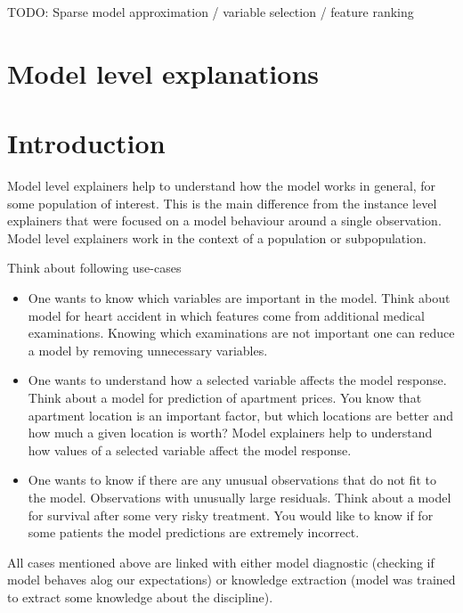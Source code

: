 \documentclass[]{krantz}
\providecommand{\tightlist}{%
  \setlength{\itemsep}{0pt}\setlength{\parskip}{0pt}}
\theoremstyle{definition}
\theoremstyle{definition}
\theoremstyle{definition}
\theoremstyle{remark}
\begin{document}
TODO: Sparse model approximation / variable selection / feature ranking

\hypertarget{model-level-explanations}{%
\section*{Model level explanations}\label{model-level-explanations}}

\hypertarget{introduction-3}{%
\section{Introduction}\label{introduction-3}}

Model level explainers help to understand how the model works in
general, for some population of interest. This is the main difference
from the instance level explainers that were focused on a model
behaviour around a single observation. Model level explainers work in
the context of a population or subpopulation.

Think about following use-cases

\begin{itemize}
\tightlist
\item
  One wants to know which variables are important in the model. Think
  about model for heart accident in which features come from additional
  medical examinations. Knowing which examinations are not important one
  can reduce a model by removing unnecessary variables.
\item
  One wants to understand how a selected variable affects the model
  response. Think about a model for prediction of apartment prices. You
  know that apartment location is an important factor, but which
  locations are better and how much a given location is worth? Model
  explainers help to understand how values of a selected variable affect
  the model response.
\item
  One wants to know if there are any unusual observations that do not
  fit to the model. Observations with unusually large residuals. Think
  about a model for survival after some very risky treatment. You would
  like to know if for some patients the model predictions are extremely
  incorrect.
\end{itemize}

All cases mentioned above are linked with either model diagnostic
(checking if model behaves alog our expectations) or knowledge
extraction (model was trained to extract some knowledge about the
discipline).
\end{document}
